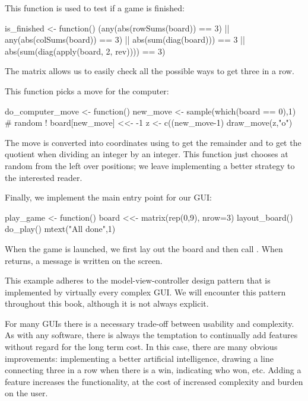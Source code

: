 This function is used to test if a game is finished:
\begin{Schunk}
\begin{Sinput}
 is_finished <- function() {
   (any(abs(rowSums(board)) == 3) || 
    any(abs(colSums(board)) == 3) || 
    abs(sum(diag(board))) == 3 || 
    abs(sum(diag(apply(board, 2, rev)))) == 3)
 }
\end{Sinput}
\end{Schunk}
%
The matrix  allows us to easily check all the possible ways
to get three in a row.

This function picks a move for the computer:
\begin{Schunk}
\begin{Sinput}
 do_computer_move <- function() {
   new_move <- sample(which(board == 0),1) # random !
   board[new_move] <<- -1    
   z <- c((new_move-1) %
   draw_move(z,"o")
 }
\end{Sinput}
\end{Schunk}
%
The move is converted into coordinates using \code{\%\%} to get the
remainder and \code{\%/\%} to get the quotient when dividing an
integer by an integer. This function just chooses at random from the
left over positions; we leave implementing a better strategy to the
interested reader.

Finally, we implement the main entry point for our GUI:
\begin{Schunk}
\begin{Sinput}
 play_game <- function() {
   board <<- matrix(rep(0,9), nrow=3)  
   layout_board()
   do_play()
   mtext("All done\n",1)
 }
\end{Sinput}
\end{Schunk}
%
When the game is launched, we first lay out the board and then call
. When  returns, a message is written
on the screen.

This example adheres to the model-view-controller design pattern that
is implemented by virtually every complex GUI. We will encounter this
pattern throughout this book, although it is not always explicit.

For many GUIs there is a necessary trade-off between usability and
complexity. As with any software, there is always the temptation to
continually add features without regard for the long term cost. In
this case, there are many obvious improvements: implementing a better
artificial intelligence, drawing a line connecting three in a row when
there is a win, indicating who won, etc. Adding a feature increases
the functionality, at the cost of increased complexity and burden on
the user.

